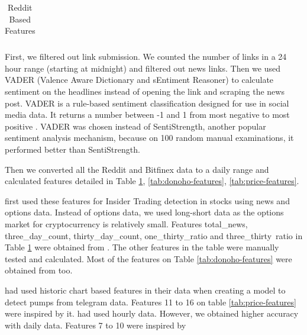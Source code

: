 \documentclass[letterpaper]{article}
\begin{document}
\begin{table}[]
\begin{tabular}{|l|l|l|l|}
\end{tabular}
\caption{Reddit Based Features}
\label{tab:Reddit-features}
\end{table}

First, we filtered out link submission. We counted the number of links in a 24 hour range (starting at midnight) 
and filtered out news links.
Then we used VADER (Valence Aware 
Dictionary and sEntiment Reasoner) to calculate sentiment on the headlines instead of opening the link and scraping 
the news post. 
VADER is a rule-based 
sentiment classification designed for use in social media data. It returns a number between -1 and 1 from 
most negative to most positive \cite{hutto2014vader}.
VADER was chosen instead of SentiStrength, another popular sentiment analysis mechanism, because on 100 
random manual
 examinations, it performed better than SentiStrength. \par 

Then we converted all the Reddit and Bitfinex data to a daily range and calculated features detailed in 
Table \ref{tab:Reddit-features}, 
\ref{tab:donoho-features}, \ref{tab:price-features}. \par

\cite{donoho2004early} first used these features for Insider Trading detection in stocks using news and options data. 
Instead of options data, we used long-short data as the options market for cryptocurrency is relatively small. 
Features total\_news, three\_day\_count, thirty\_day\_count, 
one\_thirty\_ratio and three\_thirty\ ratio in Table 
\ref{tab:Reddit-features} were obtained from \cite{donoho2004early}. The other features in the table were manually
 tested and calculated. Most of the features on Table \ref{tab:donoho-features} were obtained from 
 \cite{donoho2004early} too. \par

\cite{xu2019anatomy} had used historic chart based features in their data when creating a model to
detect pumps from telegram data. Features 11 to 16 on table \ref{tab:price-features} were inspired by it.
\cite{xu2019anatomy} had used hourly data. However, we obtained higher accuracy with 
daily data. Features 7 to 10 were inspired by \cite{donoho2004early}
\end{document}
